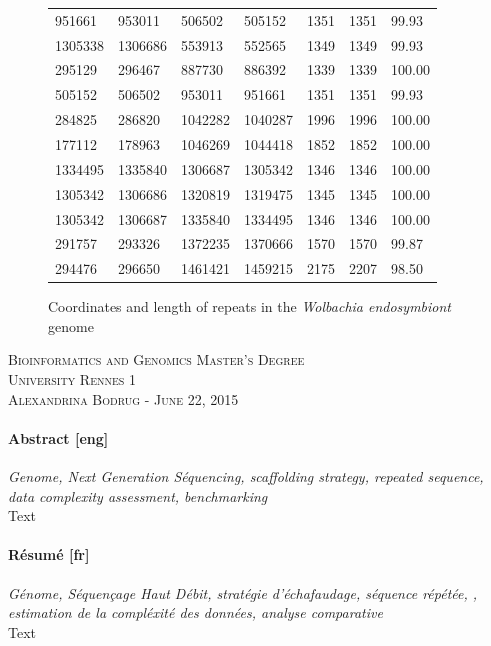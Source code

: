 \documentclass[12pt]{article}
\begin{document}
\begin{figure}[h!]
{\begin{tabular}{|l|l|l|l|l|l|l|}
951661   & 953011   & 506502   & 505152   & 1351        & 1351        & 99.93          \\
1305338  & 1306686  & 553913   & 552565   & 1349        & 1349        & 99.93          \\
295129   & 296467   & 887730   & 886392   & 1339        & 1339        & 100.00         \\
505152   & 506502   & 953011   & 951661   & 1351        & 1351        & 99.93          \\
284825   & 286820   & 1042282  & 1040287  & 1996        & 1996        & 100.00         \\
177112   & 178963   & 1046269  & 1044418  & 1852        & 1852        & 100.00         \\
1334495  & 1335840  & 1306687  & 1305342  & 1346        & 1346        & 100.00         \\
1305342  & 1306686  & 1320819  & 1319475  & 1345        & 1345        & 100.00         \\
1305342  & 1306687  & 1335840  & 1334495  & 1346        & 1346        & 100.00         \\
291757   & 293326   & 1372235  & 1370666  & 1570        & 1570        & 99.87          \\
\rowcolor{red!10}
294476   & 296650   & 1461421  & 1459215  & 2175        & 2207        & 98.50         \\ \hline
\end{tabular}
\caption{Coordinates and length of repeats in the \textit{Wolbachia endosymbiont} genome}
\label{tab:repeatcoord}
}
\end{figure}


\clearpage
\begin{center}
\textsc{\Large Bioinformatics and Genomics Master's Degree\\ University Rennes 1}\\
\textsc{Alexandrina Bodrug - June 22, 2015}
\end{center}
\vspace*{2cm}
\paragraph*{Abstract [eng]} \textit{Genome, Next Generation Séquencing, scaffolding strategy, repeated sequence, data complexity assessment, benchmarking} \\
Text
\vspace*{0.5cm}
\paragraph*{Résumé [fr]} \textit{Génome, Séquençage Haut Débit, stratégie d'échafaudage, séquence répétée, , estimation de la compléxité des données, analyse comparative}\\
Text
\end{document}
